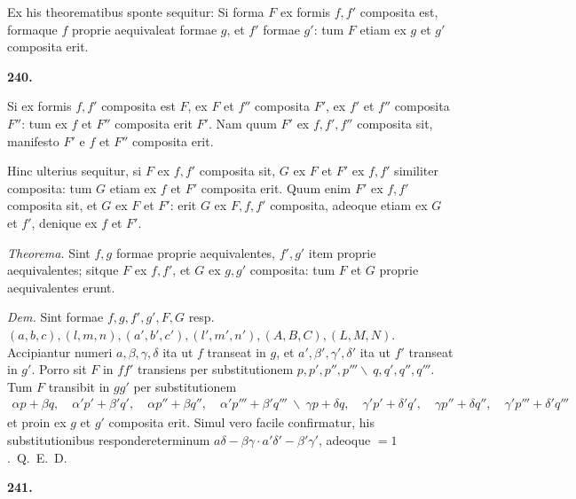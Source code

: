 \documentclass[12pt,a4paper]{article}
\theoremstyle{plain}
\theoremstyle{definition}
\theoremstyle{remark}
\begin{document}
Ex his theorematibus sponte sequitur: Si forma $F$ ex formis $f, f'$ composita est, formaque $f$ proprie aequivaleat formae $g$, et $f'$ formae $g'$: tum $F$ etiam ex $g$ et $g'$ composita erit.

\begin{center}\textbf{240.}\end{center}

Si ex formis $f, f'$ composita est $F$, ex $F$ et $f''$ composita $F'$, ex $f'$ et $f''$ composita $F''$: tum ex $f$ et $F''$ composita erit $F'$. Nam quum $F'$ ex $f, f', f''$ composita sit, manifesto $F'$ e $f$ et $F''$ composita erit.

Hinc ulterius sequitur, si $F$ ex $f, f'$ composita sit, $G$ ex $F$ et $F'$ ex $f, f'$ similiter composita: tum $G$ etiam ex $f$ et $F'$ composita erit. Quum enim $F'$ ex $f, f'$ composita sit, et $G$ ex $F$ et $F'$: erit $G$ ex $F, f, f'$ composita, adeoque etiam ex $G$ et $f'$, denique ex $f$ et $F'$.

\textit{Theorema.} Sint $f, g$ formae proprie aequivalentes, $f', g'$ item proprie aequivalentes; sitque $F$ ex $f, f'$, et $G$ ex $g, g'$ composita: tum $F$ et $G$ proprie aequivalentes erunt.

\textit{Dem.} Sint formae $f, g, f', g', F, G$ resp.\ $(a,b,c), (l,m,n), (a',b',c'), (l',m',n'), (A,B,C), (L,M,N)$. Accipiantur numeri $a, \beta, \gamma, \delta$ ita ut $f$ transeat in $g$, et $a', \beta', \gamma', \delta'$ ita ut $f'$ transeat in $g'$. Porro sit $F$ in $ff'$ transiens per substitutionem $p, p', p'', p''' \backslash\ q, q', q'', q'''$. Tum $F$ transibit in $gg'$ per substitutionem
\begin{gather*}
\alpha p + \beta q, \quad \alpha' p' + \beta' q', \quad \alpha p'' + \beta q'', \quad \alpha' p''' + \beta' q''' \
\backslash \
\gamma p + \delta q, \quad \gamma' p' + \delta' q', \quad \gamma p'' + \delta q'', \quad \gamma' p''' + \delta' q'''
\end{gather*}
et proin ex $g$ et $g'$ composita erit. Simul vero facile confirmatur, his substitutionibus respondereterminum $a\delta - \beta\gamma \cdot a'\delta' - \beta'\gamma'$, adeoque $= 1$.\ Q.\ E.\ D.

\begin{center}\textbf{241.}\end{center}
\end{document}
